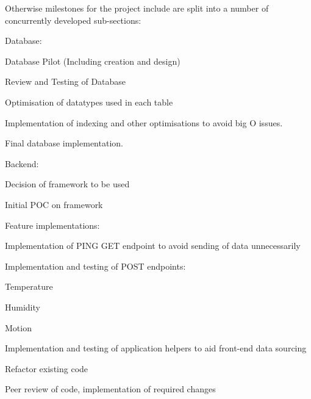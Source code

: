 \documentclass{article}
\begin{document}
            Otherwise milestones for the project include are split into a number of 
            concurrently developed sub-sections:
            \\
            \begin{legal}
                \item Database:
                \begin{legal}
                    \item Database Pilot (Including creation and design)
                    \item Review and Testing of Database
                    \item Optimisation of datatypes used in each table
                    \item Implementation of indexing and other optimisations to avoid big O issues.
                    \item Final database implementation.
                \end{legal}
                \item Backend:
                \begin{legal}
                    \item Decision of framework to be used
                    \item Initial POC on framework
                    \item Feature implementations: 
                    \begin{legal}
                        \item Implementation of PING GET endpoint to avoid sending of data unnecessarily
                        \item Implementation and testing of POST endpoints:
                        \begin{legal}
                            \item Temperature
                            \item Humidity
                            \item Motion
                        \end{legal}
                        \item Implementation and testing of application helpers to aid front-end data sourcing
                    \end{legal}
                    \item Refactor existing code
                    \begin{legal}
                        \item Peer review of code, implementation of required changes

\end{legal}
\end{legal}
\end{legal}
\end{document}

